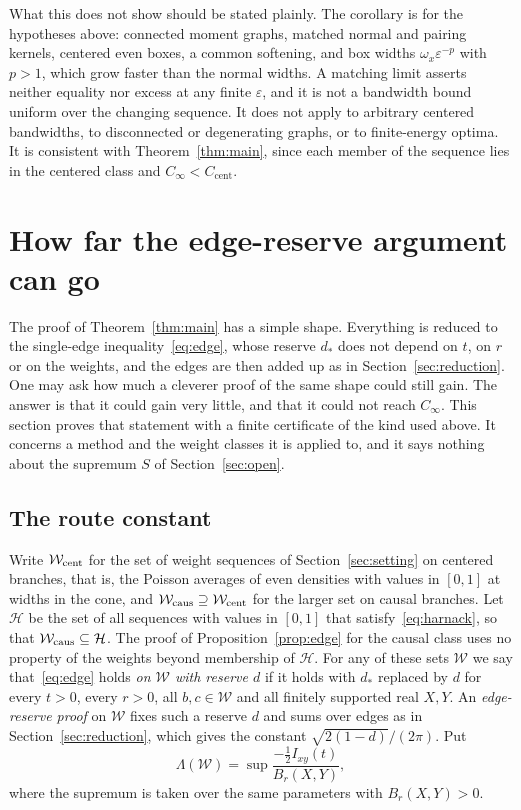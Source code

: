 \documentclass[10pt]{article}
\theoremstyle{remark}
\newcommand{\Cinf}{C_\infty}
\newcommand{\Ccent}{C_{\mathrm{cent}}}
\newcommand{\dstar}{d_{*}}
\begin{document}
What this does not show should be stated plainly. The corollary is for the hypotheses above: connected moment graphs, matched normal and pairing kernels, centered even boxes, a common softening, and box widths $\omega_x\varepsilon^{-p}$ with $p>1$, which grow faster than the normal widths. A matching limit asserts neither equality nor excess at any finite $\varepsilon$, and it is not a bandwidth bound uniform over the changing sequence. It does not apply to arbitrary centered bandwidths, to disconnected or degenerating graphs, or to finite-energy optima. It is consistent with Theorem~\ref{thm:main}, since each member of the sequence lies in the centered class and $\Cinf<\Ccent$.

\section{How far the edge-reserve argument can go}\label{sec:barrier}

The proof of Theorem~\ref{thm:main} has a simple shape. Everything is reduced to the single-edge inequality~\eqref{eq:edge}, whose reserve $\dstar$ does not depend on $t$, on $r$ or on the weights, and the edges are then added up as in Section~\ref{sec:reduction}. One may ask how much a cleverer proof of the same shape could still gain. The answer is that it could gain very little, and that it could not reach $\Cinf$. This section proves that statement with a finite certificate of the kind used above. It concerns a method and the weight classes it is applied to, and it says nothing about the supremum $S$ of Section~\ref{sec:open}.

\subsection{The route constant}

Write $\mathcal W_{\rm cent}$ for the set of weight sequences of Section~\ref{sec:setting} on centered branches, that is, the Poisson averages of even densities with values in $[0,1]$ at widths in the cone, and $\mathcal W_{\rm caus}\supseteq\mathcal W_{\rm cent}$ for the larger set on causal branches. Let $\mathcal H$ be the set of all sequences with values in $[0,1]$ that satisfy~\eqref{eq:harnack}, so that $\mathcal W_{\rm caus}\subseteq\mathcal H$. The proof of Proposition~\ref{prop:edge} for the causal class uses no property of the weights beyond membership of $\mathcal H$. For any of these sets $\mathcal W$ we say that~\eqref{eq:edge} holds \emph{on $\mathcal W$ with reserve $d$} if it holds with $\dstar$ replaced by $d$ for every $t>0$, every $r>0$, all $b,c\in\mathcal W$ and all finitely supported real $X,Y$. An \emph{edge-reserve proof} on $\mathcal W$ fixes such a reserve $d$ and sums over edges as in Section~\ref{sec:reduction}, which gives the constant $\sqrt{2(1-d)}/(2\pi)$. Put
\[
\Lambda(\mathcal W)=\sup\frac{-\tfrac12I_{xy}(t)}{B_r(X,Y)},
\]
where the supremum is taken over the same parameters with $B_r(X,Y)>0$.
\end{document}

